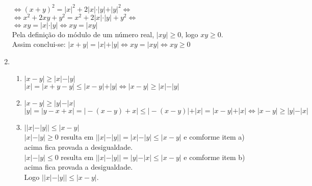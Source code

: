 \begin{enumerate}
		$\Leftrightarrow (x+y)^2 = \vert x \vert^2+2\vert x \vert\cdot\vert y \vert+ \vert y \vert^2 \Leftrightarrow $\\
		$\Leftrightarrow x^2+2xy+y^2 = x^2 +2\vert x \vert\cdot\vert y \vert+ y^2 \Leftrightarrow $\\
		$\Leftrightarrow xy = \vert x \vert\cdot\vert y \vert \Leftrightarrow xy= \vert xy \vert$\\
		Pela definição do módulo de um número real, $\vert xy \vert \geq 0$, logo $xy \geq 0$.\\
		Assim conclui-se: $\vert x + y \vert = \vert x \vert + \vert y \vert \Leftrightarrow xy= \vert xy \vert \Leftrightarrow xy \geq 0$
		\item %
			\begin{enumerate}
				\item %
				$\vert x - y \vert \geq \vert x\vert - \vert y\vert$\\
				$\vert x \vert = \vert x + y - y \vert \leq \vert x - y \vert + \vert y \vert \Leftrightarrow \vert x - y \vert \geq \vert x \vert - \vert y \vert$
				\item %
				$\vert x - y \vert \geq \vert y\vert - \vert x\vert$\\
				$\vert y \vert = \vert y - x + x \vert  = \vert -(x - y) + x \vert \leq \vert -(x - y) \vert + \vert x \vert = \vert  x - y \vert + \vert x \vert \Leftrightarrow \vert x - y \vert \geq \vert y \vert - \vert x \vert $
				\item %
				$\vert \vert x \vert - \vert y \vert \vert \leq \vert x - y\vert$\\
				$\vert x \vert  - \vert y \vert \geq 0$ resulta em  $ \vert \vert x \vert  - \vert y \vert \vert =\vert x \vert  - \vert y \vert \leq  \vert x-y \vert$ e comforme item a) acima fica provada a desigualdade.\\
				$\vert x \vert  - \vert y \vert \leq 0$ resulta em  $ \vert \vert x \vert  - \vert y \vert \vert =\vert y \vert  - \vert x \vert \leq \vert x - y  \vert$ e comforme item b) acima fica provada a desigualdade.\\
					Logo $\vert \vert x \vert - \vert y \vert \vert \leq \vert x - y\vert$.
			\end{enumerate}
\end{enumerate}